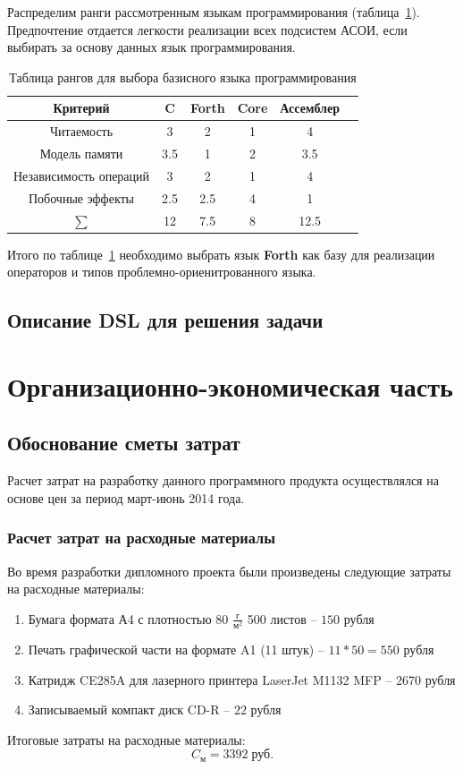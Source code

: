 \documentclass[russian,utf8,emptystyle]{eskdtext}
\begin{document}
\begin{spacing}{1.5}
Распределим ранги рассмотренным языкам программирования (таблица~\ref{tab:language_table}). Предпочтение отдается легкости реализации всех подсистем АСОИ, если выбирать за основу данных язык программирования.

\begin{table}[h!]
\centering
\caption{Таблица рангов для выбора базисного языка программирования}
\label{tab:language_table}
\begin{tabular}{c|c|c|c|c|c}
Критерий & C & Forth & Core & Ассемблер \\ 
\hline 
Читаемость             & 3   & 2     & 1 & 4 \\ 
\hline 
Модель памяти          & 3.5 & 1     & 2 & 3.5 \\ 
\hline 
Независимость операций & 3   & 2     & 1 & 4 \\ 
\hline 
Побочные эффекты       & 2.5 & 2.5   & 4 & 1 \\
\hline
$\sum$                 & 12  & 7.5   & 8 & 12.5
\end{tabular} 
\end{table}

Итого по таблице~\ref{tab:language_table} необходимо выбрать язык \textbf{Forth} как базу для реализации операторов и типов проблемно-ориенитрованного языка.

\subsection{Описание DSL для решения задачи}

\newpage
\section{Организационно-экономическая часть}
\subsection{Обоснование сметы затрат}
Расчет затрат на разработку данного программного продукта осуществлялся на основе цен за период март-июнь 2014 года.
\subsubsection{Расчет затрат на расходные материалы}
Во время разработки дипломного проекта были произведены следующие затраты на расходные материалы:
\begin{enumerate}
\item Бумага формата А4 с плотностью 80 $\frac{\text{г}}{\text{м}^2}$ 500 листов -- $150$ рубля
\item Печать графической части на формате A1 (11 штук) -- $11 * 50 = 550$ рубля
\item Катридж CE285A для лазерного принтера LaserJet M1132 MFP -- $2670$ рубля
\item Записываемый компакт диск CD-R -- $22$ рубля
\end{enumerate}
Итоговые затраты на расходные материалы: 
$$
C_\text{м} = 3392 \; \text{руб.}
$$


\end{spacing}
\end{document}
